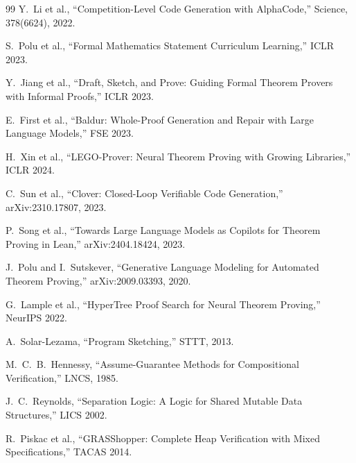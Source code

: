 \documentclass[11pt]{article}
\begin{document}
\begin{thebibliography}{99}
Y.~Li et al., ``Competition-Level Code Generation with AlphaCode,''
Science, 378(6624), 2022.

S.~Polu et al., ``Formal Mathematics Statement Curriculum Learning,''
ICLR 2023.

Y.~Jiang et al., ``Draft, Sketch, and Prove: Guiding Formal Theorem
Provers with Informal Proofs,'' ICLR 2023.

E.~First et al., ``Baldur: Whole-Proof Generation and Repair with
Large Language Models,'' FSE 2023.

H.~Xin et al., ``LEGO-Prover: Neural Theorem Proving with Growing
Libraries,'' ICLR 2024.

C.~Sun et al., ``Clover: Closed-Loop Verifiable Code Generation,''
arXiv:2310.17807, 2023.

P.~Song et al., ``Towards Large Language Models as Copilots for Theorem
Proving in Lean,'' arXiv:2404.18424, 2023.

J.~Polu and I.~Sutskever, ``Generative Language Modeling for Automated
Theorem Proving,'' arXiv:2009.03393, 2020.

G.~Lample et al., ``HyperTree Proof Search for Neural Theorem Proving,''
NeurIPS 2022.

A.~Solar-Lezama, ``Program Sketching,'' STTT, 2013.

M.~C.~B.~Hennessy, ``Assume-Guarantee Methods for Compositional
Verification,'' LNCS, 1985.

J.~C.~Reynolds, ``Separation Logic: A Logic for Shared Mutable Data
Structures,'' LICS 2002.

R.~Piskac et al., ``GRASShopper: Complete Heap Verification with Mixed
Specifications,'' TACAS 2014.

\end{thebibliography}
\end{document}
